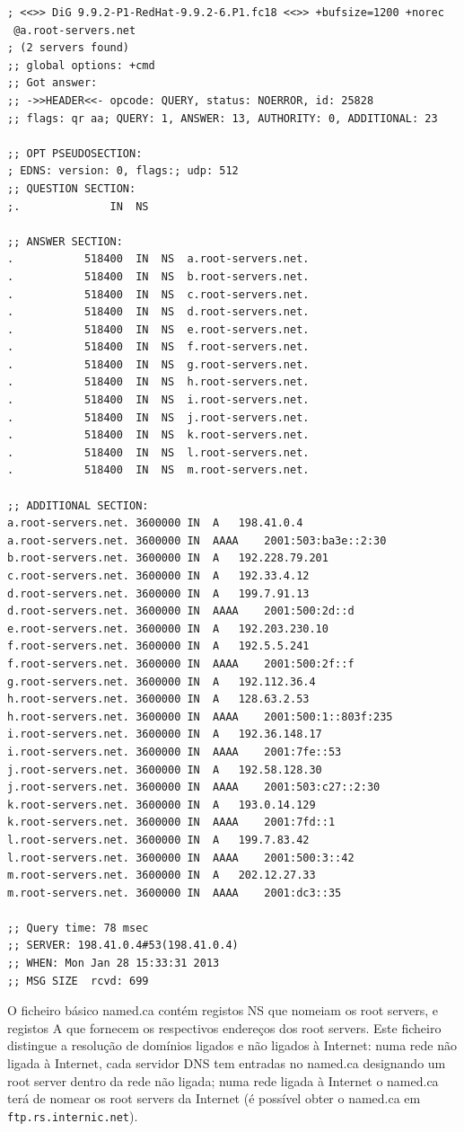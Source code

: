 \begin{verbatim}
; <<>> DiG 9.9.2-P1-RedHat-9.9.2-6.P1.fc18 <<>> +bufsize=1200 +norec
 @a.root-servers.net
; (2 servers found)
;; global options: +cmd
;; Got answer:
;; ->>HEADER<<- opcode: QUERY, status: NOERROR, id: 25828
;; flags: qr aa; QUERY: 1, ANSWER: 13, AUTHORITY: 0, ADDITIONAL: 23

;; OPT PSEUDOSECTION:
; EDNS: version: 0, flags:; udp: 512
;; QUESTION SECTION:
;.				IN	NS

;; ANSWER SECTION:
.			518400	IN	NS	a.root-servers.net.
.			518400	IN	NS	b.root-servers.net.
.			518400	IN	NS	c.root-servers.net.
.			518400	IN	NS	d.root-servers.net.
.			518400	IN	NS	e.root-servers.net.
.			518400	IN	NS	f.root-servers.net.
.			518400	IN	NS	g.root-servers.net.
.			518400	IN	NS	h.root-servers.net.
.			518400	IN	NS	i.root-servers.net.
.			518400	IN	NS	j.root-servers.net.
.			518400	IN	NS	k.root-servers.net.
.			518400	IN	NS	l.root-servers.net.
.			518400	IN	NS	m.root-servers.net.

;; ADDITIONAL SECTION:
a.root-servers.net.	3600000	IN	A	198.41.0.4
a.root-servers.net.	3600000	IN	AAAA	2001:503:ba3e::2:30
b.root-servers.net.	3600000	IN	A	192.228.79.201
c.root-servers.net.	3600000	IN	A	192.33.4.12
d.root-servers.net.	3600000	IN	A	199.7.91.13
d.root-servers.net.	3600000	IN	AAAA	2001:500:2d::d
e.root-servers.net.	3600000	IN	A	192.203.230.10
f.root-servers.net.	3600000	IN	A	192.5.5.241
f.root-servers.net.	3600000	IN	AAAA	2001:500:2f::f
g.root-servers.net.	3600000	IN	A	192.112.36.4
h.root-servers.net.	3600000	IN	A	128.63.2.53
h.root-servers.net.	3600000	IN	AAAA	2001:500:1::803f:235
i.root-servers.net.	3600000	IN	A	192.36.148.17
i.root-servers.net.	3600000	IN	AAAA	2001:7fe::53
j.root-servers.net.	3600000	IN	A	192.58.128.30
j.root-servers.net.	3600000	IN	AAAA	2001:503:c27::2:30
k.root-servers.net.	3600000	IN	A	193.0.14.129
k.root-servers.net.	3600000	IN	AAAA	2001:7fd::1
l.root-servers.net.	3600000	IN	A	199.7.83.42
l.root-servers.net.	3600000	IN	AAAA	2001:500:3::42
m.root-servers.net.	3600000	IN	A	202.12.27.33
m.root-servers.net.	3600000	IN	AAAA	2001:dc3::35

;; Query time: 78 msec
;; SERVER: 198.41.0.4#53(198.41.0.4)
;; WHEN: Mon Jan 28 15:33:31 2013
;; MSG SIZE  rcvd: 699
\end{verbatim}

O ficheiro básico named.ca contém registos NS que nomeiam os root
servers, e registos A que fornecem os respectivos endereços dos root
servers. Este ficheiro distingue a resolução de domínios ligados e não
ligados à Internet: numa rede não ligada à Internet, cada servidor DNS
tem entradas no named.ca designando um root server dentro da rede não
ligada; numa rede ligada à Internet o named.ca terá de nomear os root
servers da Internet (é possível obter o named.ca em
\texttt{ftp.rs.internic.net}).

